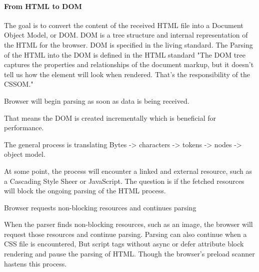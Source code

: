 

\paragraph{From HTML to DOM}


The goal is to convert the content of the received HTML file into a Document Object Model, or DOM.
DOM is a tree structure and internal representation of the HTML for the browser. %
DOM is specified in the living standard. %
The Parsing of the HTML into the DOM is defined in the HTML standard %
"The DOM tree captures the properties and relationships of the document markup, but it doesn't tell us how the element will look when rendered. 
That’s the responsibility of the CSSOM."

Browser will begin parsing as soon as data is being received. %

That means the DOM is created incrementally which is beneficial for performance.


The general process is translating Bytes -> characters -> tokens -> nodes -> object model. %




At some point, the process will encounter a linked and external resource, such as a Cascading Style Sheer or JavaScript.
The question is if the fetched resources will block the ongoing parsing of the HTML process.

Browser requests non-blocking resources and continues parsing %



When the parser finds non-blocking resources, such as an image, the browser will request those resources and continue parsing.
Parsing can also continue when a CSS file is encountered,
But script tags without async or defer attribute block rendering and pause the parsing of HTML.
Though the browser's preload scanner hastens this process.



